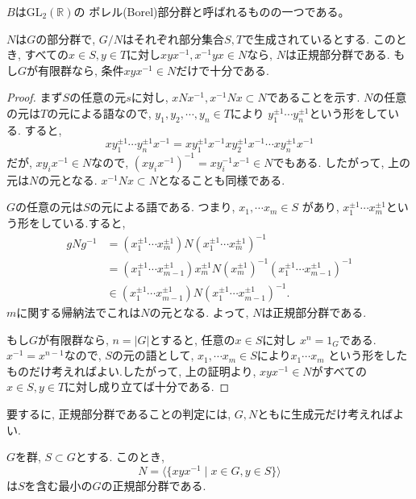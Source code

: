 $B$は$\mathrm{GL}_2(\mathbb{R})$の
ボレル(Borel)部分群と呼ばれるものの一つである。\newline

\begin{tcolorbox}
  \begin{prp*}
    $N$は$G$の部分群で, $G/N$はそれぞれ部分集合$S,T$で生成されているとする.
    このとき, すべての$x\in S, y\in T$に対し$xyx^{-1}, x^{-1}yx \in N$なら,
    $N$は正規部分群である. もし$G$が有限群なら, 
    条件$xyx^{-1}\in N$だけで十分である.
  \end{prp*}
\end{tcolorbox}
\begin{proof}
  まず$S$の任意の元$s$に対し, $xNx^{-1},x^{-1}Nx\subset N$であることを示す.
  $N$の任意の元は$T$の元による語なので, $y_1,y_2,\cdots,y_n \in T$により
  $y_1^{\pm 1}\cdots y_n^{\pm 1}$という形をしている. すると,
  \[ xy_1^{\pm 1}\cdots y_n^{\pm 1}x^{-1}
  =xy_1^{\pm 1}x^{-1} xy_2^{\pm 1}x^{-1} \cdots xy_n^{\pm 1}x^{-1}\]
  だが, $xy_ix^{-1} \in N$なので, 
  $(xy_ix^{-1})^{-1} = xy_i^{-1}x^{-1} \in N$でもある.
  したがって, 上の元は$N$の元となる.
  $x^{-1}Nx \subset N$となることも同様である.

  $G$の任意の元は$S$の元による語である. つまり, $x_1,\cdots x_m \in S$
  があり, $x_1^{\pm 1}\cdots x_m^{\pm 1}$という形をしている.すると,
  \begin{align*}
    gNg^{-1} &= (x_1^{\pm 1}\cdots x_m^{\pm 1})N
    (x_1^{\pm 1}\cdots x_m^{\pm 1})^{-1} \\
     &= (x_1^{\pm 1}\cdots x_{m-1}^{\pm 1})x_m^{\pm 1}N
     (x_m^{\pm 1})^{-1}(x_1^{\pm 1}\cdots x_{m-1}^{\pm 1})^{-1}\\
     & \in (x_1^{\pm 1}\cdots x_{m-1}^{\pm 1})N
     (x_1^{\pm 1}\cdots x_{m-1}^{\pm 1})^{-1}.
  \end{align*}
  $m$に関する帰納法でこれは$N$の元となる. よって, $N$は正規部分群である.
  
  もし$G$が有限群なら, $n=|G|$とすると, 任意の$x\in S$に対し
  $x^n=1_G$である. $x^{-1}=x^{n-1}$なので, $S$の元の語として,
  $x_1,\cdots x_m \in S$により$x_1\cdots x_m$
  という形をしたものだけ考えればよい.したがって, 上の証明より,
  $xyx^{-1} \in N$がすべての$x\in S, y \in T$に対し成り立てば十分である.
\end{proof}
要するに, 正規部分群であることの判定には, 
$G,N$ともに生成元だけ考えればよい.\newline

\begin{tcolorbox}
  $G$を群, $S\subset G$とする. このとき,
  \[ N=\langle \{xyx^{-1} \mid x \in G, y \in S\} \rangle \]
  は$S$を含む最小の$G$の正規部分群である.
\end{tcolorbox}\leavevmode

